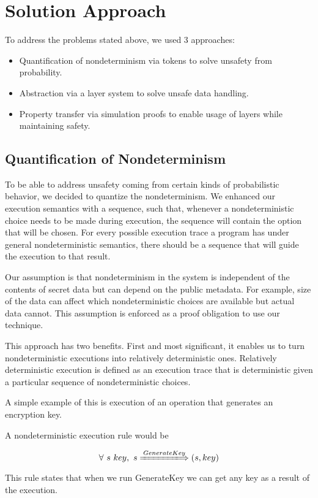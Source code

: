 
\section{Solution Approach}
To address the problems stated above, we used 3 approaches:
\begin{itemize}
	\item Quantification of nondeterminism via tokens to solve unsafety from probability.
	\item Abstraction via a layer system to solve unsafe data handling.
	\item Property transfer via simulation proofs to enable usage of layers while maintaining safety.
\end{itemize}


\subsection{Quantification of Nondeterminism}
To be able to address unsafety coming from certain kinds of probabilistic behavior, we decided to quantize the nondeterminism. We enhanced our execution semantics with a sequence, such that, whenever a nondeterministic choice needs to be made during execution, the sequence will contain the option that will be chosen. For every possible execution trace a program has under general nondeterministic semantics, there should be a sequence that will guide the execution to that result. 

Our assumption is that nondeterminism in the system is independent of the contents of secret data but can depend on the public metadata. For example, size of the data can affect which nondeterministic choices are available but actual data cannot. This assumption is enforced as a proof obligation to use our technique.

This approach has two benefits. First and most significant, it enables us to
turn nondeterministic executions into relatively deterministic ones. 
Relatively deterministic execution is defined as an execution trace that is 
deterministic given a particular sequence of nondeterministic choices.

A simple example of this is execution of an operation that generates an encryption key. 

A nondeterministic execution rule would be

$$\forall\ s\ key,\ s  \xLongrightarrow{GenerateKey} (s, key)$$ 

This rule states that when we run GenerateKey we can get any key as a result of the execution.

